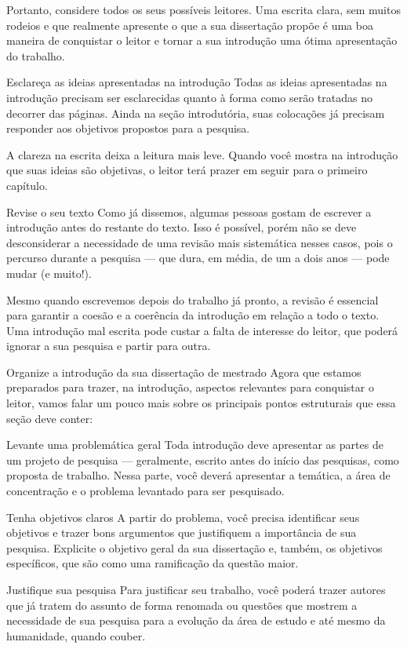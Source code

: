 Portanto, considere todos os seus possíveis leitores. Uma escrita clara, sem muitos rodeios e que realmente apresente o que a sua dissertação propõe é uma boa maneira de conquistar o leitor e tornar a sua introdução uma ótima apresentação do trabalho.

Esclareça as ideias apresentadas na introdução
Todas as ideias apresentadas na introdução precisam ser esclarecidas quanto à forma como serão tratadas no decorrer das páginas. Ainda na seção introdutória, suas colocações já precisam responder aos objetivos propostos para a pesquisa.

A clareza na escrita deixa a leitura mais leve. Quando você mostra na introdução que suas ideias são objetivas, o leitor terá prazer em seguir para o primeiro capítulo.

Revise o seu texto
Como já dissemos, algumas pessoas gostam de escrever a introdução antes do restante do texto. Isso é possível, porém não se deve desconsiderar a necessidade de uma revisão mais sistemática nesses casos, pois o percurso durante a pesquisa — que dura, em média, de um a dois anos — pode mudar (e muito!).

Mesmo quando escrevemos depois do trabalho já pronto, a revisão é essencial para garantir a coesão e a coerência da introdução em relação a todo o texto. Uma introdução mal escrita pode custar a falta de interesse do leitor, que poderá ignorar a sua pesquisa e partir para outra.

Organize a introdução da sua dissertação de mestrado
Agora que estamos preparados para trazer, na introdução, aspectos relevantes para conquistar o leitor, vamos falar um pouco mais sobre os principais pontos estruturais que essa seção deve conter:

Levante uma problemática geral
Toda introdução deve apresentar as partes de um projeto de pesquisa — geralmente, escrito antes do início das pesquisas, como proposta de trabalho. Nessa parte, você deverá apresentar a temática, a área de concentração e o problema levantado para ser pesquisado.

Tenha objetivos claros
A partir do problema, você precisa identificar seus objetivos e trazer bons argumentos que justifiquem a importância de sua pesquisa. Explicite o objetivo geral da sua dissertação e, também, os objetivos específicos, que são como uma ramificação da questão maior.

Justifique sua pesquisa
Para justificar seu trabalho, você poderá trazer autores que já tratem do assunto de forma renomada ou questões que mostrem a necessidade de sua pesquisa para a evolução da área de estudo e até mesmo da humanidade, quando couber.

